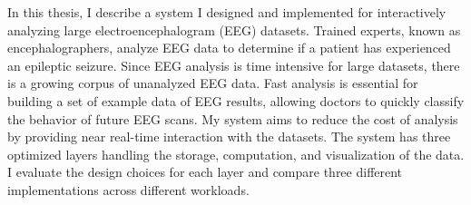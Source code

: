 % 
% 
%

In this thesis, I describe a system I designed and implemented for
interactively analyzing large electroencephalogram (EEG) datasets. Trained
experts, known as encephalographers, analyze EEG data to determine if a patient
has experienced an epileptic seizure. Since EEG analysis is time intensive for
large datasets, there is a growing corpus of unanalyzed EEG data. Fast analysis
is essential for building a set of example data of EEG results, allowing
doctors to quickly classify the behavior of future EEG scans.  My system aims
to reduce the cost of analysis by providing near real-time interaction with the
datasets. The system has three optimized layers handling the storage,
computation, and visualization of the data. I evaluate the design choices for
each layer and compare three different implementations across different
workloads.
